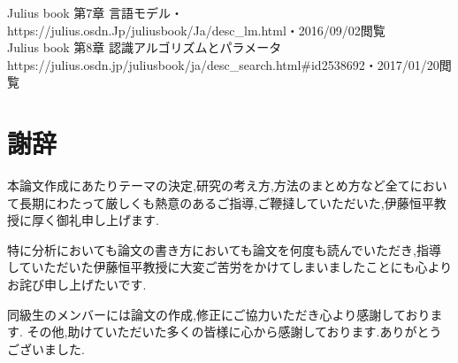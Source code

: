 \documentclass[12pt,oneside]{sotsuken_paper}
\begin{document}
\begin{thebibliography}{9}
 Julius book 第7章 言語モデル・https://julius.osdn.Jp/juliusbook/Ja/desc\_lm.html・2016/09/02閲覧\\
 Julius book 第8章 認識アルゴリズムとパラメータ https://julius.osdn.jp/juliusbook/ja/desc_search.html#id2538692・2017/01/20閲覧\\
\end{thebibliography}

\chapter*{謝辞}
本論文作成にあたりテーマの決定,研究の考え方,方法のまとめ方など全てにおいて長期にわたって厳しくも熱意のあるご指導,ご鞭撻していただいた,伊藤恒平教授に厚く御礼申し上げます.


特に分析においても論文の書き方においても論文を何度も読んでいただき,指導していただいた伊藤恒平教授に大変ご苦労をかけてしまいましたことにも心よりお詫び申し上げたいです.


同級生のメンバーには論文の作成,修正にご協力いただき心より感謝しております.
その他,助けていただいた多くの皆様に心から感謝しております.ありがとうございました.
\end{document}
